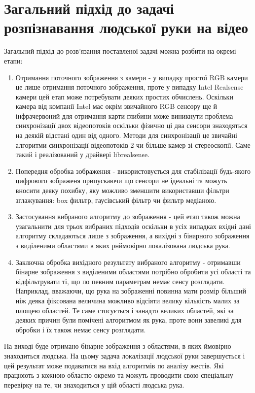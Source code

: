 \section{Загальний підхід до задачі розпізнавання людської руки на відео}

Загальний підхід до розв'язання поставленої задачі можна розбити на окремі етапи:
\begin{enumerate}
	\item Отримання поточного зображення з камери - у випадку простої RGB камери це лише отримання поточного зображення, проте у випадку Intel Realsense камери цей етап може потребувати деяких простих обчислень. Оскільки камера від компанії Intel має окрім звичайного RGB сенсору ще й інфрачервоний для отримання карти глибини може виникнути проблема синхронізації двох відеопотоків оскільки фізично ці два сенсори знаходяться на деякій відстані один від одного. Методи для синхронізації це звичайні алгоритми синхронізації відеопотоків 2 чи більше камер зі стереоскопії. Саме такий і реалізований у драйвері librealsense.
	\item Попередня обробка зображення - використовується для стабілізації будь-якого цифрового зображеня припускаючи що сенсори не ідеальні та можуть вносити деяку похибку, яку можливо зменшити використавши фільтри зглажування: box фильтр, гаусівський фільтр чи фильтр медіаною.
	\item Застосування вибраного алгоритму до зображення - цей етап також можна узагальнити для трьох вибраних підходів оскільки в усіх випадках вхідні дані алгоритму складаються лише з зображення, а вихідні з бінарного зображення з виділеними областями в яких рнймовірно локалізована людська рука.
	\item Заключна обробка вихідного результату вибраного алгоритму - отримавши бінарне зображення з виділеними областями потрібно обробити усі області та відфільтрувати ті, що по певним параметрам немає сенсу розглядати. Наприклад, вважаючи, що рука на зображенні повинна мати розмір більший ніж деяка фіксована величина можливо відсіяти велику кількість малих за площею областей. Те саме стосується і занадто великих областей, які за деяких причин були помічені алгоритмом як рука, проте вони завеликі для обробки і їх також немає сенсу розглядати.
\end{enumerate}

На виході буде отримано бінарне зображення з областями, в яких ймовірно знаходиться людська. На цьому задача локалізації людської руки завершується і цей результат може подаватися на вхід алгоритмів по аналізу жестів. Які працюють з кожною областю окремо та можуть проводити свою спеціальну перевірку на те, чи знаходиться у цій області людська рука.